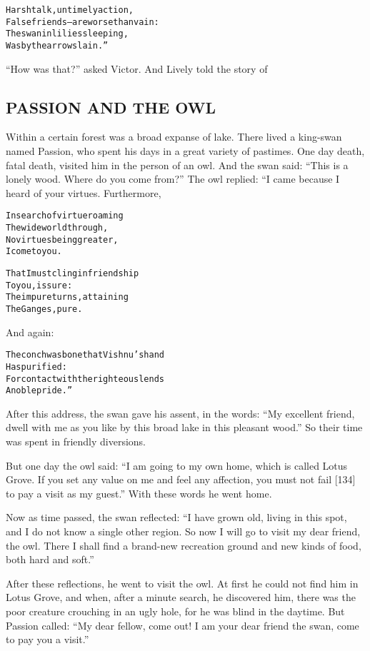 \documentclass{article}
\renewenvironment{verbatim}{\begin{alltt}\normalfont\begin{centering}}{\end{centering}\end{alltt}}
\begin{document}
\begin{verbatim}
Harsh talk, untimely action,
    False friends--are worse than vain:
The swan in lilies sleeping,
    Was by the arrow slain.”
\end{verbatim}
``How was that?'' asked Victor. And Lively told the story of

\subsection{PASSION AND THE OWL}

Within a certain forest was a broad expanse of lake. There lived a
king-swan named Passion, who spent his days in a great variety of
pastimes. One day death, fatal death, visited him in the person of
an owl. And the swan said:
``This is a lonely wood. Where do you come from?'' The owl replied:
“I came because I heard of your virtues. Furthermore,

\begin{verbatim}
In search of virtue roaming
    The wide world through,
No virtues being greater,
    I come to you.

That I must cling in friendship
    To you, is sure:
The impure turns, attaining
    The Ganges, pure.
\end{verbatim}
And again:

\begin{verbatim}
The conch was bone that Vishnu's hand
    Has purified:
For contact with the righteous lends
    A noble pride.”
\end{verbatim}
After this address, the swan gave his assent, in the words:
``My excellent friend, dwell with me as you like by this broad lake in this pleasant wood.''
So their time was spent in friendly diversions.

But one day the owl said:
``I am going to my own home, which is called Lotus Grove. If you set any value on me and feel any affection, you must not fail [134] to pay a visit as my guest.''
With these words he went home.

Now as time passed, the swan reflected:
``I have grown old, living in this spot, and I do not know a single other region. So now I will go to visit my dear friend, the owl. There I shall find a brand-new recreation ground and new kinds of food, both hard and soft.''

After these reflections, he went to visit the owl. At first he
could not find him in Lotus Grove, and when, after a minute search,
he discovered him, there was the poor creature crouching in an ugly
hole, for he was blind in the daytime. But Passion called:
``My dear fellow, come out! I am your dear friend the swan, come to pay you a visit.''
\end{document}
